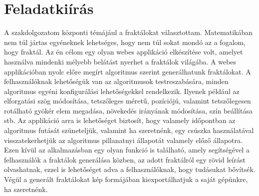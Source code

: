 \chapter*{Feladatkiírás}
A szakdolgozatom központi témájául a fraktálokat választottam. Matematikában nem túl jártas egyéneknek lehetséges, hogy nem túl sokat mondó az a fogalom, hogy fraktál. Az én célom egy olyan webes applikáció elkészítése volt, amelyet használva mindenki mélyebb belátást nyerhet a fraktálok világába. A webes applikációban nyolc előre megírt algoritmus szerint generálhatunk fraktálokat. A felhasználóknak lehetőségük van az algoritmusok testreszabására, minden algoritmus egyéni konfigurálási lehetőségekkel rendelkezik. Ilyenek például az elforgatási szög módosítása, tetszőleges méretű, pozíciójú, valamint tetszőlegesen rotálható gyökér elem megadása, növekedés irányának módosítása, szín beállítása stb. Az applikáció arra is lehetőséget biztosít, hogy valamely időpontban az algoritmus futását szüneteljük, valamint ha szeretnénk, egy csúszka használatával visszatekerhetjük az algoritmus pillanatnyi állapotát valamely előző állapotra. Ezen kívül az alkalmazásban egy olyan funkció is található, amely segítségével a felhasználók a fraktálok generálása közben, az adott fraktálról egy rövid leírást olvashatnak, ezzel is lehetőséget adva a felhasználóknak, hogy tudásukat bővítsék. Végül a generált fraktálokat kép formájában kiexportálhatjuk a saját gépünkre, ha szeretnénk.

